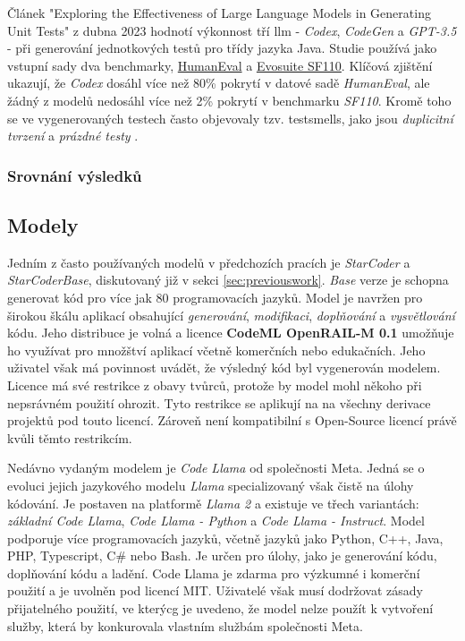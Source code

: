 \documentclass[12pt]{article}
\begin{document}
        Článek "Exploring the Effectiveness of Large Language Models in Generating Unit Tests" \cite{siddiq2023exploring} z dubna 2023 hodnotí výkonnost tří \gls{llm} - \textit{Codex}, \textit{CodeGen} a \textit{GPT-3.5} - při generování jednotkových testů pro třídy jazyka Java. Studie používá jako vstupní sady dva benchmarky, \href{https://paperswithcode.com/dataset/humaneval-x}{HumanEval} a \href{https://paperswithcode.com/dataset/evosuite-sf110-benchmark}{Evosuite SF110}. Klíčová zjištění ukazují, že \textit{Codex} dosáhl více než 80\% pokrytí v datové sadě \textit{HumanEval}, ale žádný z modelů nedosáhl více než 2\% pokrytí v benchmarku \textit{SF110}. Kromě toho se ve vygenerovaných testech často objevovaly tzv. \gls{testsmells}, jako jsou \textit{duplicitní tvrzení} a \textit{prázdné testy} \cite{testsmells}.

            \subsubsection{Srovnání výsledků}


        \subsection{Modely}

            Jedním z často používaných modelů v předchozích pracích je \textit{StarCoder} a \textit{StarCoderBase}, diskutovaný již v sekci \ref{sec:previouswork}. \textit{Base} verze je schopna generovat kód pro více jak 80 programovacích jazyků. Model je navržen pro širokou škálu aplikací obsahující \textit{generování}, \textit{modifikaci}, \textit{doplňování} a \textit{vysvětlování} kódu. Jeho distribuce je volná a licence \textbf{CodeML OpenRAIL-M 0.1} \cite{BigCode2023} umožňuje ho využívat pro množštví aplikací včetně komerčních nebo edukačních. Jeho uživatel však má povinnost uvádět, že výsledný kód byl vygenerován modelem. Licence má své restrikce z obavy tvůrců, protože by model mohl někoho při nepsrávném použití ohrozit. Tyto restrikce se aplikují na na všechny derivace projektů pod touto licencí. Zároveň není kompatibilní s Open-Source licencí právě kvůli těmto restrikcím.

            Nedávno vydaným modelem je \textit{Code Llama} od společnosti Meta. Jedná se o evoluci jejich jazykového modelu \textit{Llama} specializovaný však čistě na úlohy kódování. Je postaven na platformě \textit{Llama 2} a existuje ve třech variantách: \textit{základní Code Llama}, \textit{Code Llama - Python} a \textit{Code Llama - Instruct}. Model podporuje více programovacích jazyků, včetně jazyků jako Python, C++, Java, PHP, Typescript, C# nebo Bash. Je určen pro úlohy, jako je generování kódu, doplňování kódu a ladění. Code Llama je zdarma pro výzkumné i komerční použití a je uvolněn pod licencí MIT. Uživatelé však musí dodržovat  zásady přijatelného použití, ve kterýcg je uvedeno, že model nelze použít k vytvoření služby, která by konkurovala vlastním službám společnosti Meta. 
\end{document}

